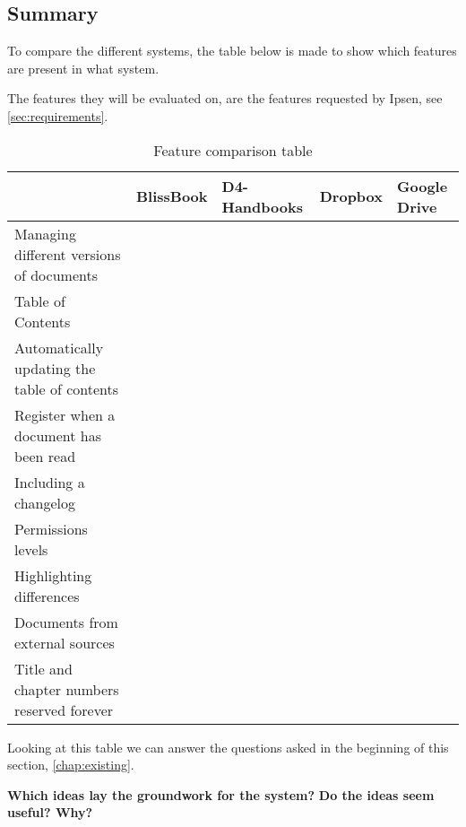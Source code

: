 \subsection{Summary}
To compare the different systems, the table below is made to show which features are present in what system.

The features they will be evaluated on, are the features requested by Ipsen, see \cref{sec:requirements}.

\begin{table}[H]
	\begin{center}
		\begin{tabular}{| m{5cm}|m{1.6cm}|m{2cm}|m{1.5cm}|m{1.2cm}|}
			\hline
			& BlissBook  & D4-Handbooks & Dropbox & Google \newline Drive \\
			\hline
			Managing different versions of documents & \checkmark &  &  & \checkmark \\
			\hline
			Table of Contents & \checkmark & \checkmark  & & \\
			\hline
			Automatically updating the table of contents & \checkmark & \checkmark  &  & \\
			\hline
			Register when a document has been read & \checkmark & \checkmark &  & \\
			\hline
			Including a changelog & \checkmark & \checkmark  &  & \\
			\hline
			Permissions levels & \checkmark &  & \checkmark & \checkmark \\
			\hline
			Highlighting differences & \checkmark &  &  & \checkmark\\
			\hline
			Documents from external \newline sources &  &  & \checkmark & \checkmark \\
			\hline
			Title and chapter numbers \newline reserved forever &  &  &  & \\
			\hline
		\end{tabular}
		\caption{Feature comparison table}\label{tab:Exsisting}
	\end{center}
\end{table}

Looking at this table we can answer the questions asked in the beginning of this section, \cref{chap:existing}.

\textbf{Which ideas lay the groundwork for the system?}
\newline\indent
\textbf{Do the ideas seem useful? Why?}

